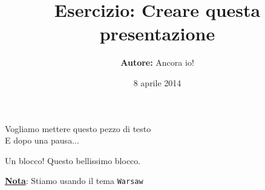 \documentclass{beamer}
\title[Imparando Beamer]{{\bf Esercizio}: Creare questa presentazione}
\author{{\bf Autore:} Ancora io!}
\date{8 aprile 2014}
\begin{document}
\begin{frame}
\titlepage
\end{frame}

\begin{frame}
Vogliamo mettere questo pezzo di testo  \\
\vspace{2cm}
E dopo una pausa...
\pause
\begin{block}{Un blocco!}
Questo bellissimo blocco.
\end{block}
\pause
\underline{\bf Nota}: Stiamo usando il tema \texttt{Warsaw}
\end{frame}
\end{document}
